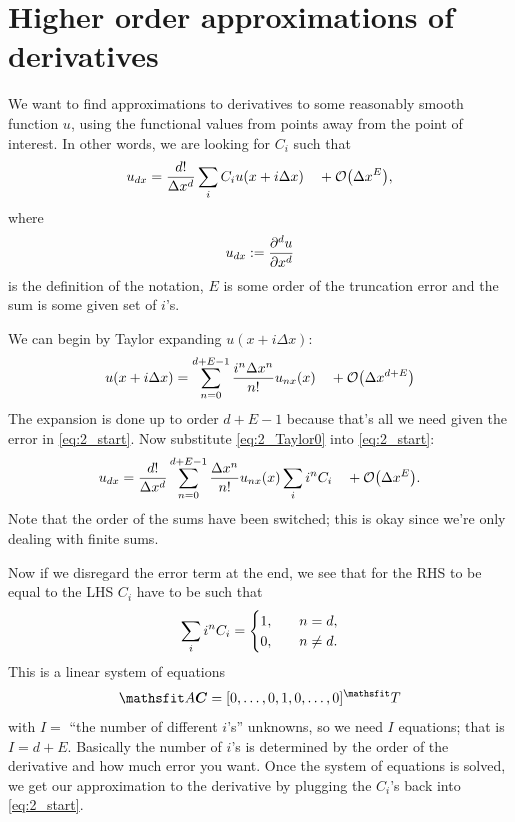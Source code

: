 \documentclass[11pt,letter, swedish, english
]{article}
\begin{document}
\section{Higher order approximations of derivatives}
\newcommand{\Dx}{\ensuremath{\Delta{x}}}
We want to find approximations to derivatives to some reasonably
smooth function $u$, using the functional values from points away from
the point of interest. In other words, we are looking for $C_i$ such
that\footnotemark{}
\begin{equation}\label{eq:2_start}
u_{dx}=\frac{d!}{\Dx^d} \sum_i C_i u(x+i\Dx) \quad+\order{\Dx^E},
\end{equation}
where
\begin{equation}
u_{dx}:=\pdv[d]{u}{x}
\end{equation}
is the definition of the notation, $E$ is some order of the truncation
error and the sum is some given set of $i$'s.


We can begin by Taylor expanding $u(x+i\Dx)$:
\begin{equation}\label{eq:2_Taylor0}
u(x+i\Dx) = \sum_{n=0}^{d+E-1}
\frac{i^n\Dx^n}{n!} u_{nx}(x)
\quad+\order{\Dx^{d+E}}
\end{equation}
The expansion is done up to order $d+E-1$ because that's all we need
given the error in \eqref{eq:2_start}. Now substitute
\eqref{eq:2_Taylor0} into \eqref{eq:2_start}: 
\begin{equation}
u_{dx}=\frac{d!}{\Dx^d} \sum_{n=0}^{d+E-1}
\frac{\Dx^n}{n!} u_{nx}(x) \sum_i i^nC_i 
\quad+\order{\Dx^E}.
\end{equation}
Note that the order of the sums have been switched; this is okay since
we're only dealing with finite sums. 

Now if we disregard the error term at the end, we see that for the RHS
to be equal to the LHS $C_i$ have to be such that\footnotemark{}
\begin{equation}
\sum_i i^nC_i=
\begin{cases}
1\qcomma&n=d,\\
0,& n\neq d.
\end{cases}
\end{equation}
This is a linear system of equations 
\begin{equation}
\mathsf{A}\vb*{C}=[0, \ldots, 0, 1, 0, \ldots, 0]^\mathsfrm{T}
\end{equation}
with $I=$ ``the number of different
$i$'s'' unknowns, so we need $I$ equations; that is $I=d+E$. Basically
the number of $i$'s is determined by the order of the derivative and
how much error you want. 
Once the system of equations is solved, we get our approximation to
the derivative by plugging the $C_i$'s back into \eqref{eq:2_start}.
\end{document}
